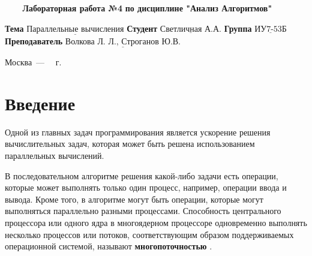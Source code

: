\documentclass[a4paper,14pt, unknownkeysallowed]{extreport}
\begin{document}
\begin{titlepage}
	
	\begin{center}
		\noindent\begin{minipage}{1.3\textwidth}\centering
		\Large\textbf{   ~~~ Лабораторная работа №4}\newline
		\textbf{по дисциплине "Анализ Алгоритмов"}\newline\newline\newline
		\end{minipage}
	\end{center}
	
	\noindent\textbf{Тема} 			$\underline{\text{Параллельные вычисления}}$\newline\newline
	\noindent\textbf{Студент} 		$\underline{\text{Светличная А.А.}}$\newline\newline
	\noindent\textbf{Группа} 		$\underline{\text{ИУ7-53Б}}$\newline\newline
	\noindent\textbf{Преподаватель} $\underline{\text{Волкова Л. Л., Строганов Ю.В.}}$\newline
	
	\begin{center}
		\vfill
		Москва~---~\the\year
		~г.
	\end{center}
	\restoregeometry
\end{titlepage}
	
	\setcounter{page}{2}
	\tableofcontents
	
\newpage
\chapter*{Введение}
	
	
Одной из главных задач программирования является ускорение решения вычислительных задач, которая может быть решена использованием параллельных вычислений.

В последовательном алгоритме решения какой-либо задачи есть операции, которые может выполнять только один процесс, например, операции ввода и вывода. 
Кроме того, в алгоритме могут быть операции, которые могут выполняться параллельно разными процессами. 
Способность центрального процессора или одного ядра в многоядерном процессоре одновременно выполнять несколько процессов или потоков, соответствующим образом поддерживаемых операционной системой, называют \textbf{многопоточностью} \cite{gladyshev}.
\end{document}

